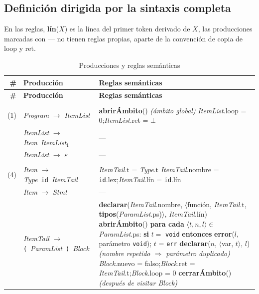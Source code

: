 \documentclass[11pt]{article}
\newcommand{\NT}[1]{\textcolor{ntcolor}{\textit{#1}}}            %
\newcommand{\T}[1]{\textcolor{tcolor}{\texttt{#1}}}              %
\newcommand{\A}[2]{\NT{#1}.\textsf{#2}}                          %
\newcommand{\fn}[1]{\textsf{\textbf{#1}}}                        %
\newcommand{\ty}[1]{\texttt{#1}}                                 %
\newcommand{\kw}[1]{\textbf{#1}}                                 %
\begin{document}
\subsection{Definición dirigida por la sintaxis completa}

En las reglas, \fn{lín}($X$) es la línea del primer token derivado de $X$, las producciones marcadas con \textcolor{gray}{---} no tienen reglas propias, aparte de la convención de copia de \textsf{loop} y \textsf{ret}.

{\small
\begin{longtable}{@{}r@{\hspace{6pt}}>{\raggedright\arraybackslash}p{5.6cm}@{\hspace{8pt}}>{\raggedright\arraybackslash}p{9.9cm}@{}}
\caption{Producciones y reglas semánticas}\\
\toprule
\textbf{\#} & \textbf{Producción} & \textbf{Reglas semánticas} \\
\midrule
\endfirsthead
\toprule
\textbf{\#} & \textbf{Producción} & \textbf{Reglas semánticas} \\
\midrule
\endhead
\bottomrule
\endfoot
\multicolumn{3}{l}{\textbf{Programa}} \\ \midrule
{(1)} & \NT{Program} $\rightarrow$ \NT{ItemList} & \fn{abrirÁmbito}() \quad\textit{(ámbito global)} \newline \A{ItemList}{loop} = 0;\quad \A{ItemList}{ret} = $\bot$ \\
\addlinespace[2pt]
{(2)} & \NT{ItemList} $\rightarrow$ \NT{Item}\ \NT{ItemList}$_{1}$ & \textcolor{gray}{---} \\
\addlinespace[2pt]
{(3)} & \NT{ItemList} $\rightarrow$ $\varepsilon$ & \textcolor{gray}{---} \\
\addlinespace[2pt]
\midrule
\multicolumn{3}{l}{\textbf{Declaraciones}} \\ \midrule
{(4)} & \NT{Item} $\rightarrow$ \NT{Type}\ \T{id}\ \NT{ItemTail} & \A{ItemTail}{t} = \A{Type}{t} \newline \A{ItemTail}{nombre} = \T{id}.\textsf{lex};\quad \A{ItemTail}{lín} = \T{id}.\textsf{lín} \\
\addlinespace[2pt]
{(5)} & \NT{Item} $\rightarrow$ \NT{Stmt} & \textcolor{gray}{---} \\
\addlinespace[2pt]
{(6)} & \NT{ItemTail} $\rightarrow$ \T{(}\ \NT{ParamList}\ \T{)}\ \NT{Block} & \fn{declarar}(\A{ItemTail}{nombre}, $\langle$\textsf{función}, \A{ItemTail}{t}, \fn{tipos}(\A{ParamList}{ps})$\rangle$, \A{ItemTail}{lín}) \newline \fn{abrirÁmbito}() \newline \kw{para cada} $\langle t, n, l\rangle \in$ \A{ParamList}{ps}: \kw{si} $t =$ \ty{void} \kw{entonces} \fn{error}($l$, parámetro \ty{void}); $t$ = \ty{err} \newline \hspace*{1.5em}\fn{declarar}($n$, $\langle$\textsf{var}, $t\rangle$, $l$) \quad\textit{(nombre repetido $\Rightarrow$ parámetro duplicado)} \newline \A{Block}{nuevo} = \textsf{falso};\quad \A{Block}{ret} = \A{ItemTail}{t};\quad \A{Block}{loop} = 0 \newline \fn{cerrarÁmbito}() \quad\textit{(después de visitar \NT{Block})} \\

\end{longtable}}
\end{document}
